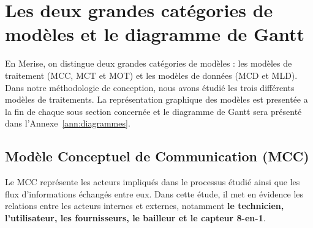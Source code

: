 \section{Les deux grandes catégories de modèles et le diagramme de Gantt}
En Merise, on distingue deux grandes catégories de modèles : les modèles de traitement (MCC, MCT et MOT) et les modèles de données (MCD et MLD). Dans notre méthodologie de conception, nous avons étudié les trois différents modèles de traitements.
La représentation graphique des modèles est presentée a la fin de chaque sous section concernée et le diagramme de Gantt sera présenté dans l’Annexe~\ref{ann:diagrammes}.

\subsection{Modèle Conceptuel de Communication (MCC)}
Le MCC représente les acteurs impliqués dans le processus étudié ainsi que les flux d’informations échangés entre eux. 
Dans cette étude, il met en évidence les relations entre les acteurs internes et externes, notamment \textbf{le technicien, l’utilisateur, les fournisseurs, le bailleur et le capteur 8-en-1}. 

